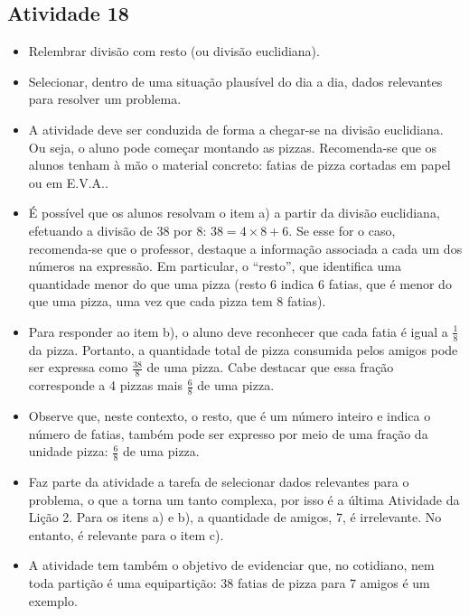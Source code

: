 \begin{multicols}{2}
\subsection{Atividade 18}

 \vspace{.1cm}

\begin{itemize} %
    \item       Relembrar divisão com resto (ou divisão euclidiana).
    \item       Selecionar, dentro de uma situação plausível do dia a dia, dados relevantes para resolver um problema.
\end{itemize} %
\vspace{.1cm}


  \vspace{.1cm}

  \vspace{.1cm}

\begin{itemize} %
    \item       A atividade deve ser conduzida de forma a chegar-se na divisão euclidiana. Ou seja, o aluno pode começar montando as pizzas. Recomenda-se que os alunos tenham à mão o material concreto: fatias de pizza cortadas em papel ou em E.V.A..
    \item       É possível que os alunos resolvam o item a) a partir da divisão euclidiana, efetuando a divisão de 38 por 8: $38 = 4 \times 8 + 6$. Se esse for o caso, recomenda-se que o professor, destaque a informação associada a cada um dos números na expressão. Em particular, o       ``resto'', que identifica uma quantidade menor do que uma pizza (resto 6 indica 6 fatias, que é menor do que uma pizza, uma vez que cada pizza tem 8 fatias).
    \item       Para responder ao item b), o aluno deve reconhecer que cada fatia é igual a       $\frac{1}{8}$ da pizza. Portanto, a quantidade total de pizza consumida pelos amigos pode ser expressa como       $\frac{38}{8}$ de uma pizza. Cabe destacar que essa fração corresponde a 4 pizzas mais $\frac{6}{8}$ de uma pizza.
    \item        Observe que, neste contexto, o resto, que é um número inteiro e indica o número de fatias, também pode ser expresso por meio de uma fração da unidade pizza:       $\frac{6}{8}$ de uma pizza.
    \item       Faz parte da atividade a tarefa de selecionar dados relevantes para o problema, o que a torna um tanto complexa, por isso é a última Atividade da Lição 2. Para os itens a) e b), a quantidade de amigos, 7, é irrelevante. No entanto, é relevante para o item c).
    \item       A atividade tem também o objetivo de evidenciar que, no cotidiano, nem toda partição é uma equipartição: 38 fatias de pizza para 7 amigos é um exemplo.
\end{itemize} %


\end{multicols}
